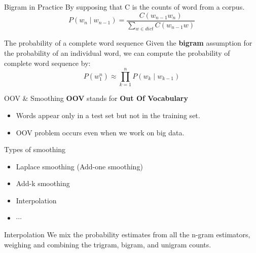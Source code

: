 \documentclass{beamer}
\begin{document}
\begin{frame}{Bigram in Practice}
By supposing that C is the counts of word from a corpus.
    $$P(w_n\mid w_{n-1}) = \frac{C(w_{n-1}w_n)}{\sum_{w\in dict}C(w_{n-1}w)}$$

\end{frame}


\begin{frame}{The probability of a complete word sequence}
    Given the \textbf{bigram} assumption for the probability of an individual word, we can compute the probability of complete word sequence by:
    $$P(w_1^n) \approx \prod_{k=1}^nP(w_k\mid w_{k-1})$$



\end{frame}


\begin{frame}{OOV \& Smoothing}
    \textbf{OOV} stands for \textbf{Out Of Vocabulary}\\
    \begin{itemize}
        \item Words appear only in a test set but not in the training set.
        \item OOV problem occurs even when we work on big data.
    \end{itemize}
\end{frame}

\begin{frame}{Types of smoothing}
    \begin{itemize}
        \item Laplace smoothing (Add-one smoothing)
        \item Add-k smoothing
        \item Interpolation
        \item $\cdots$
    \end{itemize}
    \begin{block}{Interpolation}
        We mix the probability estimates from all the n-gram estimators, weighing and combining the trigram, bigram, and unigram counts.
    \end{block}
\end{frame}
\end{document}
